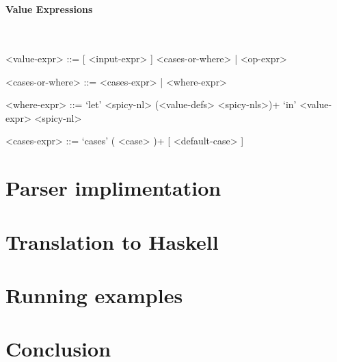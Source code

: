 \documentclass{article}
\def\H{Haskell}
\begin{document}
\hspace{1cm}\\

\paragraph{Value Expressions}

\hspace{1cm}\\
\begin{grammar}

<value-expr> ::= [ <input-expr> ] <cases-or-where> | <op-expr>

<cases-or-where> ::= <cases-expr> | <where-expr>

<where-expr> ::=
`let' <spicy-nl> (<value-defs> <spicy-nls>)+ `in' <value-expr> <spicy-nl>

<cases-expr> ::= `cases' ( <case> )+ [ <default-case> ]

\end{grammar}

\section{Parser implimentation}
\section{Translation to \H}
\section{Running examples}
\section{Conclusion}

\hspace{1cm}\\

%
%
%
%

\end{document}
